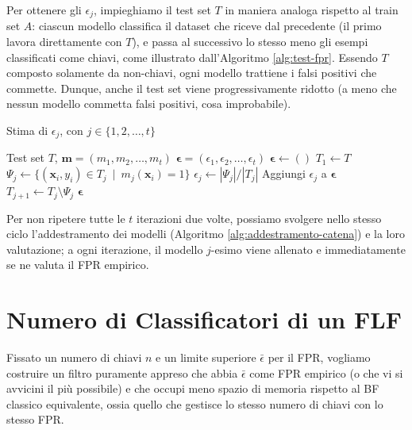 Per ottenere gli $\epsilon_j$, impieghiamo il test set $T$ in maniera analoga rispetto al train set $A$: ciascun modello classifica il dataset che riceve dal precedente (il primo lavora direttamente con $T$), e passa al successivo lo stesso meno gli esempi classificati come chiavi, come illustrato dall'Algoritmo \ref{alg:test-fpr}. Essendo $T$ composto solamente da non-chiavi, ogni modello trattiene i falsi positivi che commette.
Dunque, anche il test set viene progressivamente ridotto (a meno che nessun modello commetta falsi positivi, cosa improbabile).

\begin{algorithm}
    \caption{Stima di $\epsilon_j$, con $j\in\{1, 2, \ldots, t\}$}
    \begin{algorithmic}[1]
        \Require Test set $T$, $\mathbf{m} = (m_1, m_2, \dots, m_t)$
        \Ensure $\boldsymbol{\epsilon} = (\epsilon_1, \epsilon_2, \dots, \epsilon_t)$
        \State $\boldsymbol{\epsilon} \gets ()$
        \State $T_1 \gets T$
            \State $\Psi_j \gets \{(\mathbf{x}_i, y_i) \in T_j \enspace | \enspace m_j(\mathbf{x}_i)=1 \}$ 
            \State $\epsilon_j \gets |\Psi_j| /{|T_j|}$
            \State Aggiungi $\epsilon_j$ a $\boldsymbol{\epsilon}$
                \State $T_{j+1} \gets T_j \setminus \Psi_j$ 
            \EndIf
        \EndFor
        \State \Return $\boldsymbol{\epsilon}$
    \end{algorithmic}
    \label{alg:test-fpr}
\end{algorithm}

Per non ripetere tutte le $t$ iterazioni due volte, possiamo svolgere nello stesso ciclo l'addestramento dei modelli (Algoritmo \ref{alg:addestramento-catena}) e la loro valutazione; a ogni iterazione, il modello $j$-esimo viene allenato e immediatamente se ne valuta il FPR empirico.

\section{Numero di Classificatori di un FLF}

Fissato un numero di chiavi $n$ e un limite superiore $\bar \epsilon$ per il FPR, vogliamo costruire un filtro puramente appreso che abbia {$\bar\epsilon$} come FPR empirico (o che vi si avvicini il più possibile) e che occupi meno spazio di memoria rispetto al BF classico equivalente, ossia quello che gestisce lo stesso numero di chiavi con lo stesso FPR.

